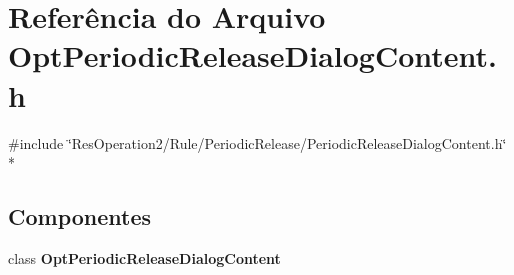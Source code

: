 \section{Referência do Arquivo Opt\+Periodic\+Release\+Dialog\+Content.\+h}
\label{_opt_periodic_release_dialog_content_8h}
{\ttfamily \#include \char`\"{}Res\+Operation2/\+Rule/\+Periodic\+Release/\+Periodic\+Release\+Dialog\+Content.\+h\char`\"{}}\\*
\subsection*{Componentes}
\begin{DoxyCompactItemize}
\item 
class {\bf Opt\+Periodic\+Release\+Dialog\+Content}
\end{DoxyCompactItemize}
